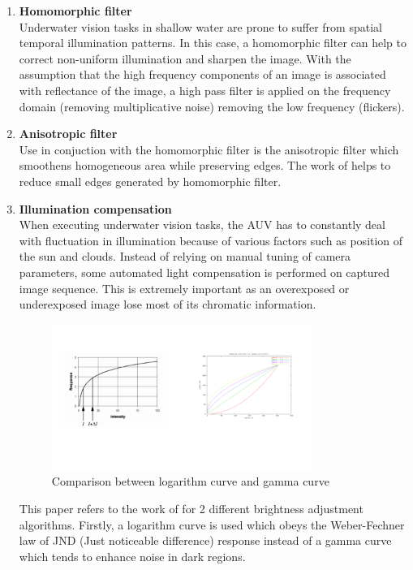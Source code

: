\documentclass[hyp]{socreport}
\begin{document}
\begin{enumerate}

\item \textbf{Homomorphic filter} \\
Underwater vision tasks in shallow water are prone to suffer from spatial
temporal illumination patterns. In this case, a homomorphic filter can help to
correct non-uniform illumination and sharpen the image. With the assumption that
the high frequency components of an image is associated with reflectance of the
image, a high pass filter is applied on the frequency domain (removing
multiplicative noise) removing the low frequency (flickers).

\item \textbf{Anisotropic filter} \\
Use in conjuction with the homomorphic filter is the anisotropic filter which
smoothens homogeneous area while preserving edges. The work of
 helps to reduce small edges generated by homomorphic filter.

\item \textbf{Illumination compensation} \\
When executing underwater vision tasks, the AUV has to constantly deal with
fluctuation in illumination because of various factors such as position of the
sun and clouds. Instead of relying on manual tuning of camera parameters, some
automated light compensation is performed on captured image sequence. This is
extremely important as an overexposed or underexposed image lose most of its
chromatic information.

\begin{figure}[H]
\centering
  \includegraphics[width=0.8\textwidth, height=0.3\textheight]{lightcompensation.png}
  \caption{Comparison between logarithm curve and gamma curve}
  \label{fig:light_compensation}
\end{figure}

This paper refers to the work of  for 2 different
brightness adjustment algorithms. Firstly, a logarithm curve is used which obeys
the Weber-Fechner law of JND (Just noticeable difference) response instead of a
gamma curve which tends to enhance noise in dark regions.

\end{enumerate}
\end{document}
